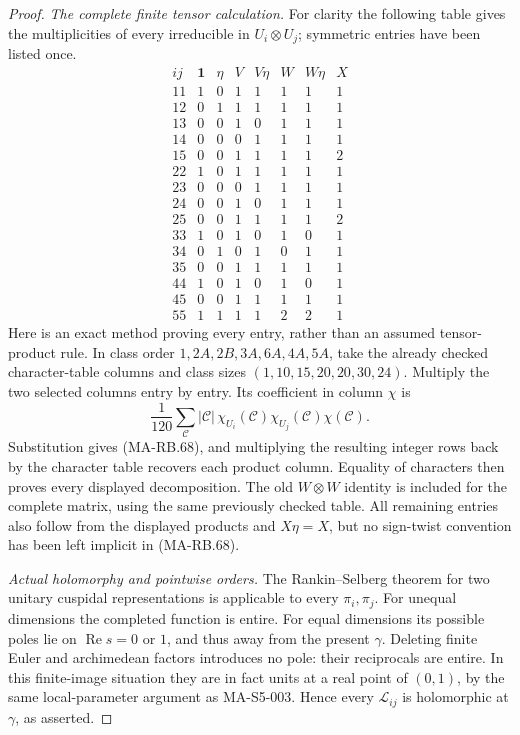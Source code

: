 \begin{proof}
\emph{The complete finite tensor calculation.}
For clarity the following table gives the multiplicities
of every irreducible in \(U_i\otimes U_j\); symmetric
entries have been listed once.
\[
 \begin{array}{c|rrrrrrr}
  ij&\mathbf1&\eta&V&V\eta&W&W\eta&X\\ \hline
  11&1&0&1&1&1&1&1\\
  12&0&1&1&1&1&1&1\\
  13&0&0&1&0&1&1&1\\
  14&0&0&0&1&1&1&1\\
  15&0&0&1&1&1&1&2\\
  22&1&0&1&1&1&1&1\\
  23&0&0&0&1&1&1&1\\
  24&0&0&1&0&1&1&1\\
  25&0&0&1&1&1&1&2\\
  33&1&0&1&0&1&0&1\\
  34&0&1&0&1&0&1&1\\
  35&0&0&1&1&1&1&1\\
  44&1&0&1&0&1&0&1\\
  45&0&0&1&1&1&1&1\\
  55&1&1&1&1&2&2&1
 \end{array}
 \tag{MA-RB.68}
\]
Here is an exact method proving every entry, rather
than an assumed tensor-product rule. In class order
\(1,2A,2B,3A,6A,4A,5A\), take the already checked
character-table columns and class sizes
\((1,10,15,20,20,30,24)\). Multiply the two selected
columns entry by entry. Its coefficient in column
\(\chi\) is
\[
 \frac1{120}\sum_{\mathcal C}|\mathcal C|\,
      \chi_{U_i}(\mathcal C)\chi_{U_j}(\mathcal C)
                                      \chi(\mathcal C).
\]
Substitution gives (MA-RB.68), and multiplying the
resulting integer rows back by the character table
recovers each product column. Equality of characters
then proves every displayed decomposition.
The old \(W\otimes W\) identity is included for the
complete matrix, using the same previously checked table.
All remaining entries also follow from the displayed
products and \(X\eta=X\), but no sign-twist convention
has been left implicit in (MA-RB.68).

\emph{Actual holomorphy and pointwise orders.}
The Rankin--Selberg theorem for two unitary cuspidal
representations is applicable to every \(\pi_i,\pi_j\).
For unequal dimensions the completed function is entire.
For equal dimensions its possible poles lie on
\(\operatorname{Re}s=0\) or \(1\), and thus away
from the present \(\gamma\). Deleting finite Euler
and archimedean factors introduces no pole: their
reciprocals are entire. In this finite-image situation
they are in fact units at a real point of \((0,1)\),
by the same local-parameter argument as MA-S5-003.
Hence every \(\mathcal L_{ij}\) is holomorphic at
\(\gamma\), as asserted.


\end{proof}
